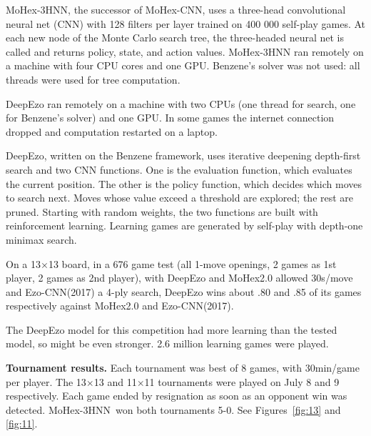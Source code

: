 \documentclass{IOS-Book-Article}
\def\Eo{\mbox{\sc Ezo}}
\def\Ec{\mbox{\sc Ezo-CNN}}
\def\Ed{\mbox{\sc DeepEzo}}
\def\Mc{\mbox{\sc MoHex-CNN}}
\def\Mt{\mbox{\sc MoHex-3HNN}}
\begin{document}
\Mt{}, the successor of \Mc,
uses a three-head convolutional neural net (CNN)
with 128 filters per layer \cite{GMH18}
trained on 400 000 self-play games.
At each new node of the Monte Carlo search tree, 
the three-headed neural net is called
and returns policy, state, and action values.
\Mt{} ran remotely on a machine with four CPU cores and one GPU.
Benzene's solver was not used:
all threads were used for tree computation.

\Ed{} ran remotely on a machine
with two CPUs (one thread for search,
one for Benzene's solver) and one GPU.
In some games the internet connection dropped
and computation restarted on a laptop.

\Ed{}, written on the Benzene framework,
uses iterative deepening depth-first search and 
two CNN functions.
One is the evaluation function, which evaluates the current position.
The other is the policy function, 
which decides which moves to search next.
Moves whose value exceed a threshold are explored;
the rest are pruned.
Starting with random weights,
the two functions are built with reinforcement learning.
Learning games are generated by self-play with
depth-one minimax search.

On a 13$\times$13 board,
in a 676 game test
(all 1-move openings, 2 games as 1st player, 2 games as 2nd player),
with \Ed{} and MoHex2.0 allowed 30s/move and \Ec{}(2017) 
a 4-ply search,
\Ed{} wins about .80 and .85 of its games respectively against
MoHex2.0 and \Ec{}(2017).

The \Ed{} model for this competition had more
learning than the tested model, so might be even stronger.
2.6 million learning games were played.

{\bf Tournament results.}
Each tournament was best of 8 games,
with 30min/game per player.
The 13$\times$13 and 11$\times$11 tournaments were played
on July 8 and 9 respectively.
Each game ended by resignation as soon as an opponent win was detected.
\Mt\ won both tournaments 5-0.
See Figures~\ref{fig:13} and \ref{fig:11}.
\end{document}
